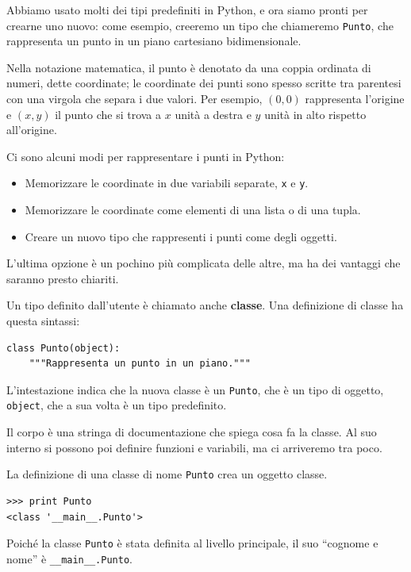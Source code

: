 \documentclass[10pt]{book}
\begin{document}
Abbiamo usato molti dei tipi predefiniti in Python, e ora siamo pronti
   per crearne uno nuovo: come esempio, creeremo un tipo che chiameremo {\tt Punto}, che rappresenta un punto in un piano cartesiano bidimensionale.

Nella notazione matematica, il punto è denotato da una coppia ordinata di numeri, dette coordinate; le coordinate dei punti sono spesso scritte tra parentesi con una virgola che separa i due valori. Per esempio, $(0,0)$ rappresenta l'origine e $(x,y)$ il punto che si trova a $x$ unità a destra e $y$ unità in alto rispetto all'origine.

Ci sono alcuni modi per rappresentare i punti in Python:

\begin{itemize}

\item Memorizzare le coordinate in due variabili separate, {\tt x} e {\tt y}.

\item Memorizzare le coordinate come elementi di una lista o di una tupla.

\item Creare un nuovo tipo che rappresenti i punti come degli oggetti.

\end{itemize}

L'ultima opzione è un pochino più complicata delle altre, ma ha dei vantaggi che saranno presto chiariti.

Un tipo definito dall'utente è chiamato anche {\bf classe}.
Una definizione di classe ha questa sintassi:

\begin{verbatim}
class Punto(object):
    """Rappresenta un punto in un piano."""
\end{verbatim}
%
L'intestazione indica che la nuova classe è un {\tt Punto},
che è un tipo di oggetto, {\tt object}, che a sua volta è un tipo predefinito.

Il corpo è una stringa di documentazione che spiega cosa fa la classe. Al suo interno si possono poi definire funzioni e variabili, ma ci arriveremo tra poco.

La definizione di una classe di nome {\tt Punto} crea un oggetto classe.

\begin{verbatim}
>>> print Punto
<class '__main__.Punto'>
\end{verbatim}
%
Poiché la classe {\tt Punto} è stata definita al livello principale, il suo ``cognome e nome'' è \verb"__main__.Punto".
\end{document}
